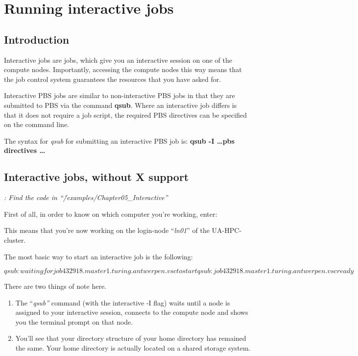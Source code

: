 \chapter{Running interactive jobs}

\section{Introduction}

Interactive jobs are jobs, which give you an interactive session on one of the compute nodes. Importantly, accessing the compute nodes this way means that the job control system guarantees the resources that you have asked for.

Interactive PBS jobs are similar to non-interactive PBS jobs in that they are submitted to PBS via the command \textbf{qsub}. Where an interactive job differs is that it does not require a job script, the required PBS directives can be specified on the command line.

The syntax for \textit{qsub} for submitting an interactive PBS job is:
\textbf{qsub -I \ldots pbs directives \ldots}

\section{Interactive jobs, without X support}

\textit{: Find the code in ``\~/examples/Chapter05\_Interactive''}

\textit{}

First of all, in order to know on which computer you're working, enter:

This means that you're now working on the login-node ``\textit{ln01}'' of the UA-HPC-cluster.

The most basic way to start an interactive job is the following:
\begin{prompt}
$ %
qsub: waiting for job 432918.master1.turing.antwerpen.vsc to start
qsub: job 432918.master1.turing.antwerpen.vsc ready
$
\end{prompt}

There are two things of note here.

\begin{enumerate}
\item  The ``\textit{qsub''} command (with the interactive -I flag) waits until a node is assigned to your interactive session, connects to the compute node and shows you the terminal prompt on that node.
\item  You'll see that your directory structure of your home directory has remained the same. Your home directory is actually located on a shared storage system.
\end{enumerate}


